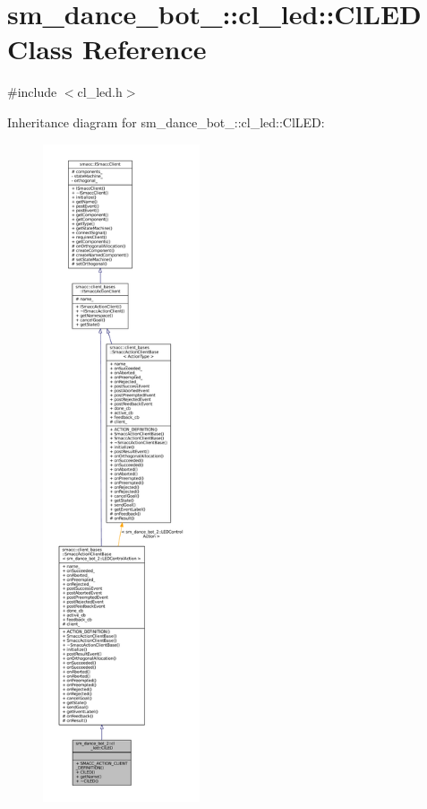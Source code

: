 \hypertarget{classsm__dance__bot__2_1_1cl__led_1_1ClLED}{}\section{sm\+\_\+dance\+\_\+bot\+\_\+:\+:cl\+\_\+led\+:\+:Cl\+L\+ED Class Reference}
\label{classsm__dance__bot__2_1_1cl__led_1_1ClLED}


{\ttfamily \#include $<$cl\+\_\+led.\+h$>$}



Inheritance diagram for sm\+\_\+dance\+\_\+bot\+\_\+:\+:cl\+\_\+led\+:\+:Cl\+L\+ED\+:
\nopagebreak
\begin{figure}[H]
\begin{center}
\leavevmode
\includegraphics[height=550pt]{classsm__dance__bot__2_1_1cl__led_1_1ClLED__inherit__graph}
\end{center}
\end{figure}


